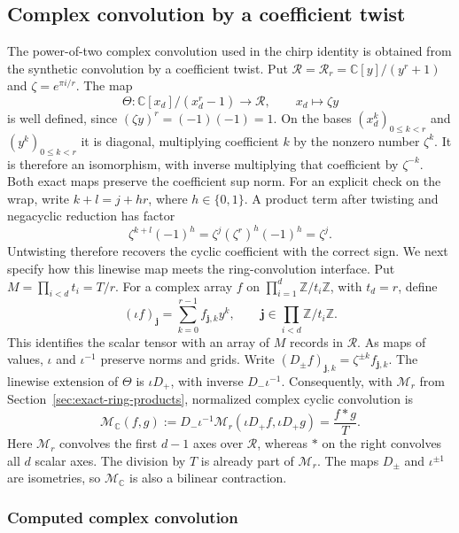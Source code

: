 \documentclass[11pt]{article}
\theoremstyle{definition}
\begin{document}
\subsection{Complex convolution by a coefficient twist}

The power-of-two complex convolution used in the chirp identity is
obtained from the synthetic convolution by a coefficient twist.
Put $\mathcal R=\mathcal R_r=\mathbb C[y]/(y^r+1)$ and
$\zeta=e^{\pi i/r}$.  The map
\[
 \Theta:\mathbb C[x_d]/(x_d^r-1)\longrightarrow\mathcal R,
 \qquad x_d\longmapsto\zeta y
\]
is well defined, since $(\zeta y)^r=(-1)(-1)=1$.  On the bases
$(x_d^k)_{0\le k<r}$ and $(y^k)_{0\le k<r}$ it is diagonal,
multiplying coefficient $k$ by the nonzero number $\zeta^k$.  It is therefore an
isomorphism, with inverse multiplying that coefficient by
$\zeta^{-k}$.  Both exact maps preserve the coefficient sup norm.
For an explicit check on the wrap, write $k+l=j+hr$, where
$h\in\{0,1\}$.  A product term after twisting and negacyclic reduction
has factor
\[
 \zeta^{k+l}(-1)^h=\zeta^j(\zeta^r)^h(-1)^h=\zeta^j.
\]
Untwisting therefore recovers the cyclic coefficient with the correct
sign.  We next specify how this linewise map meets the ring-convolution
interface.  Put $M=\prod_{i<d}t_i=T/r$.  For a complex array $f$ on
$\prod_{i=1}^d\mathbb Z/t_i\mathbb Z$, with $t_d=r$, define
\[
 (\iota f)_{\boldsymbol j}
   =\sum_{k=0}^{r-1}f_{\boldsymbol j,k}y^k,
 \qquad
 \boldsymbol j\in\prod_{i<d}\mathbb Z/t_i\mathbb Z.
\]
This identifies the scalar tensor with an array of $M$ records in
$\mathcal R$. As maps of values, $\iota$ and $\iota^{-1}$ preserve norms
and grids. Write
$(D_\pm f)_{\boldsymbol j,k}=\zeta^{\pm k}f_{\boldsymbol j,k}$.
The linewise extension of $\Theta$ is $\iota D_+$, with inverse
$D_-\iota^{-1}$.  Consequently, with $\mathcal M_r$ from
Section~\ref{sec:exact-ring-products}, normalized complex cyclic
convolution is
\[
 \mathcal M_{\mathbb C}(f,g)
   :=D_-\iota^{-1}
       \mathcal M_r(\iota D_+f,\iota D_+g)
    =\frac{f*g}{T}.
\]
Here $\mathcal M_r$ convolves the first $d-1$ axes over $\mathcal R$,
whereas $*$ on the right convolves all $d$ scalar axes.  The division
by $T$ is already part of $\mathcal M_r$.  The maps $D_\pm$ and
$\iota^{\pm1}$ are isometries, so $\mathcal M_{\mathbb C}$ is also a
bilinear contraction.

\subsubsection{Computed complex convolution}
\end{document}
